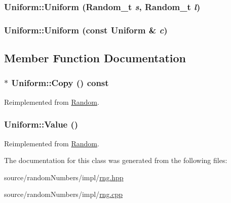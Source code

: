 \hypertarget{classUniform_9b95c12d202e21df337cd579e4231759}{
\subsubsection[{Uniform}]{\setlength{\rightskip}{0pt plus 5cm}Uniform::Uniform ({\bf Random\_\-t} {\em s}, \/  {\bf Random\_\-t} {\em l})}}
\label{classUniform_9b95c12d202e21df337cd579e4231759}


\hypertarget{classUniform_6478f6ddeca630eb927c3bbef84702f3}{
\subsubsection[{Uniform}]{\setlength{\rightskip}{0pt plus 5cm}Uniform::Uniform (const {\bf Uniform} \& {\em c})}}
\label{classUniform_6478f6ddeca630eb927c3bbef84702f3}




\subsection{Member Function Documentation}
\hypertarget{classUniform_11e73242faca88963143bdb3d296a48b}{
\subsubsection[{Copy}]{ $\ast$ Uniform::Copy () const}}
\label{classUniform_11e73242faca88963143bdb3d296a48b}




Reimplemented from \hyperlink{classRandom_22b2951acd2008e8ff58fae434ab7ac5}{Random}.\hypertarget{classUniform_0e0f9905cd20d6e6560d168ac75bbce2}{
\subsubsection[{Value}]{ Uniform::Value ()}}
\label{classUniform_0e0f9905cd20d6e6560d168ac75bbce2}




Reimplemented from \hyperlink{classRandom_4d1c2876c5c78104186e241209d0e11e}{Random}.

The documentation for this class was generated from the following files:\begin{CompactItemize}
\item 
source/randomNumbers/impl/\hyperlink{rng_8hpp}{rng.hpp}\item 
source/randomNumbers/impl/\hyperlink{rng_8cpp}{rng.cpp}\end{CompactItemize}
